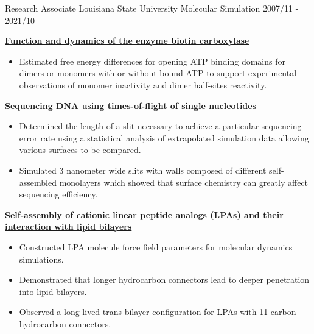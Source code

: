 \pagebreak


\begin{cventries}
  \cventry
    {Research Associate} %
    {Louisiana State University} %
    {Molecular Simulation} %
    {2007/11 - 2021/10} %
    {
        \begin{cvitems} %
            \item {\textbf{\underline{Function and dynamics of the enzyme biotin carboxylase}}}
                \vspace{2pt}
                \begin{itemize}
                \item {Estimated free energy differences for opening ATP binding domains for dimers or monomers with or without bound ATP to support experimental observations of monomer inactivity and dimer half-sites reactivity.}
                \end{itemize}
            \item {\textbf{\underline{Sequencing DNA using times-of-flight of single nucleotides}}}
                \vspace{2pt}
                \begin{itemize}
                    \item {Determined the length of a slit necessary to achieve a particular sequencing error rate using a statistical analysis of extrapolated simulation data allowing various surfaces to be compared.}
                    \item {Simulated 3 nanometer wide slits with walls composed of different self-assembled monolayers which showed that surface chemistry can greatly affect sequencing efficiency.}
                \end{itemize}        
            \item {\textbf{\underline{Self-assembly of cationic linear peptide analogs (LPAs) and their interaction with lipid bilayers}}}
                \vspace{2pt}
                \begin{itemize}
                \item{Constructed LPA molecule force field parameters for molecular dynamics simulations.}
                \item {Demonstrated that longer hydrocarbon connectors lead to deeper penetration into lipid bilayers.}
                \item {Observed a long-lived trans-bilayer configuration for LPAs with 11 carbon hydrocarbon connectors.}

\end{itemize}
\end{cvitems}}
\end{cventries}
